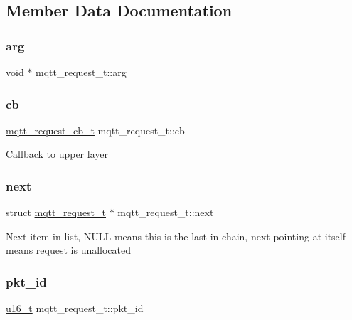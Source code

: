 \subsection{Member Data Documentation}
\mbox{\label{structmqtt__request__t_a4489023eb18e6cff7829e4bb2e66227f}} 
\subsubsection{\texorpdfstring{arg}{arg}}
{\footnotesize\ttfamily void $\ast$ mqtt\+\_\+request\+\_\+t\+::arg}

\mbox{\label{structmqtt__request__t_a32a4b14b0b8b5b8ce8db1074e53f4a79}} 
\subsubsection{\texorpdfstring{cb}{cb}}
{\footnotesize\ttfamily \hyperlink{group__mqtt_gacad2bbe2cee76eaa120cc63e2f6094fd}{mqtt\+\_\+request\+\_\+cb\+\_\+t} mqtt\+\_\+request\+\_\+t\+::cb}

Callback to upper layer \mbox{\label{structmqtt__request__t_af313d3aad3b4be3e61547ff3f1188ea1}} 
\subsubsection{\texorpdfstring{next}{next}}
{\footnotesize\ttfamily struct \hyperlink{structmqtt__request__t}{mqtt\+\_\+request\+\_\+t} $\ast$ mqtt\+\_\+request\+\_\+t\+::next}

Next item in list, N\+U\+LL means this is the last in chain, next pointing at itself means request is unallocated \mbox{\label{structmqtt__request__t_af2dc3cd85cdad25b9b3e1534ecc0cb58}} 
\subsubsection{\texorpdfstring{pkt\+\_\+id}{pkt\_id}}
{\footnotesize\ttfamily \hyperlink{group__compiler__abstraction_ga77570ac4fcab86864fa1916e55676da2}{u16\+\_\+t} mqtt\+\_\+request\+\_\+t\+::pkt\+\_\+id}

